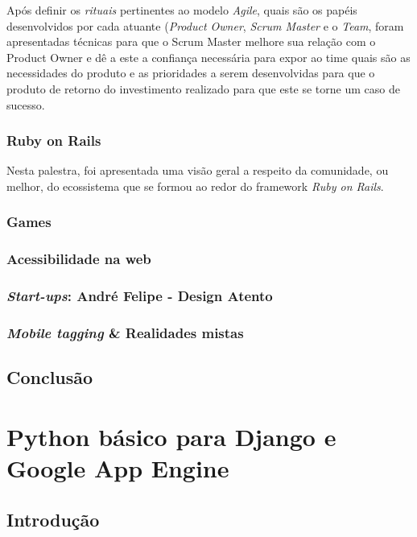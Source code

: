 \documentclass[a4paper]{report}
\begin{document}
            Após definir os \emph{rituais} pertinentes ao modelo \emph{Agile},
            quais são os papéis desenvolvidos por cada atuante (\emph{Product Owner},
            \emph{Scrum Master} e o \emph{Team}, foram apresentadas técnicas
            para que o Scrum Master melhore sua relação com o Product Owner
            e dê a este a confiança necessária para expor ao time quais são
            as necessidades do produto e as prioridades a serem desenvolvidas
            para que o produto de retorno do investimento realizado para que
            este se torne um caso de sucesso.

            \subsection{Ruby on Rails}
            Nesta palestra, foi apresentada uma visão geral a respeito da
            comunidade, ou melhor, do ecossistema que se formou ao redor do
            framework \emph{Ruby on Rails}.

            \subsection{Games}

            \subsection{Acessibilidade na web}

            \subsection{\emph{Start-ups}: André Felipe - Design Atento}

            \subsection{\emph{Mobile tagging} \& Realidades mistas}

        \section{Conclusão}

    \chapter[Python básico]{Python básico para Django e Google App Engine}

        \section{Introdução}
\end{document}
